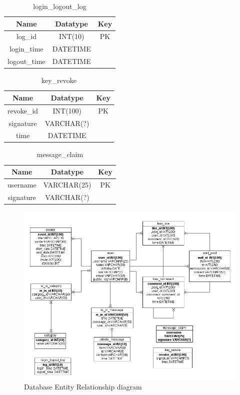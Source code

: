 \begin{table}[!ht]
\caption{login\_logout\_log}
\centering
\begin{tabular}{c c c}
\hline\hline
Name               & Datatype    & Key \\
\hline
log\_id            & INT(10)     & PK  \\
login\_time        & DATETIME    &     \\
logout\_time       & DATETIME    &     \\
\hline
\end{tabular}
\label{table:nonlin}
\end{table}

\begin{table}[!ht]
\caption{key\_revoke}
\centering
\begin{tabular}{c c c}
\hline\hline
Name               & Datatype    & Key \\
\hline
revoke\_id         & INT(100)     & PK  \\
signature          & VARCHAR(?)   &     \\
time               & DATETIME     &     \\
\hline
\end{tabular}
\label{table:nonlin}
\end{table}

\begin{table}[!ht]
\caption{message\_claim}
\centering
\begin{tabular}{c c c}
\hline\hline
Name               & Datatype    & Key \\
\hline
username           & VARCHAR(25) & PK  \\
signature          & VARCHAR(?)  &     \\
\hline
\end{tabular}
\label{table:nonlin}
\end{table}

\clearpage

\begin{landscape}
\begin{figure}[h]
    
    \includegraphics[width=1.2\textwidth]{images/design/project_er_diagram.png}
    \caption{Database Entity Relationship diagram}
    \label{fig:db_er_diag}
\end{figure}
\end{landscape}